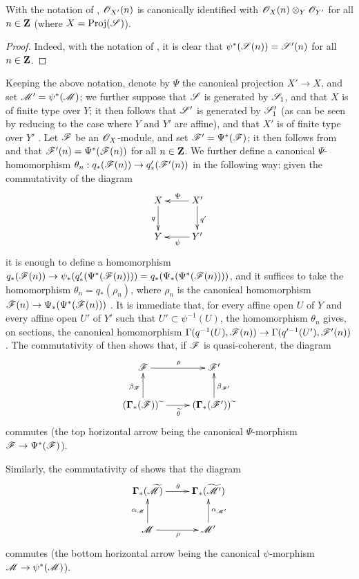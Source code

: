 \begin{corollary}[3.5.4]
\label{II.3.5.4}
With the notation of , $\mathscr{O}_{X'}(n)$ is canonically identified with $\mathscr{O}_X(n)\otimes_Y\mathscr{O}_{Y'}$ for all $n\in\mathbf{Z}$ (where $X=\operatorname{Proj}(\mathscr{S})$).
\end{corollary}

\begin{proof}
Indeed, with the notation of , it is clear that $\psi^*(\mathscr{S}(n))=\mathscr{S}'(n)$ for all $n\in\mathbf{Z}$.
\end{proof}

\begin{env}[3.5.5]
\label{II.3.5.5}
Keeping the above notation, denote by $\Psi$ the canonical projection $X'\to X$, and set $\mathscr{M}'=\psi^*(\mathscr{M})$;
we further suppose that $\mathscr{S}$ is generated by $\mathscr{S}_1$, and that $X$ is of finite type over $Y$;
it then follows that $\mathscr{S}'$ is generated by $\mathscr{S}'_1$ (as can be seen by reducing to the case where $Y$ and $Y'$ are affine), and that $X'$ is of finite type over $Y'$ .
Let $\mathscr{F}$ be an $\mathscr{O}_X$-module, and set $\mathscr{F}'=\Psi^*(\mathscr{F})$;
it then follows from  and  that $\mathscr{F}'(n)=\Psi^*(\mathscr{F}(n))$ for all $n\in\mathbf{Z}$.
We further define a canonical $\Psi$-homomorphism $\theta_n:q_*(\sh{F}(n))\to q'_*(\sh{F}'(n))$ in the following way: given the commutativity of the diagram
\[
  \xymatrix{
    X \ar[d]_{q}
    & X' \ar[l]_{\Psi} \ar[d]^{q'}
  \\Y
    & Y' \ar[l]^{\psi}
  }
\]
it is enough to define a homomorphism $q_*(\sh{F}(n))\to\psi_*(q'_*(\Psi^*(\sh{F}(n))))=q_*(\Psi_*(\Psi^*(\sh{F}(n))))$, and it suffices to take the homomorphism $\theta_n=q_*(\rho_n)$, where $\rho_n$ is the canonical homomorphism $\sh{F}(n)\to\Psi_*(\Psi^*(\sh{F}(n)))$ .
It is immediate that, for every affine open $U$ of $Y$ and every affine open $U'$ of $Y'$ such that $U'\subset\psi^{-1}(U)$, the homomorphism $\theta_n$ gives, on sections, the canonical homomorphism  $\Gamma(q^{-1}(U),\sh{F}(n))\to\Gamma(q'^{-1}(U'),\sh{F}'(n))$.
The commutativity of  then shows that, if $\mathscr{F}$ is quasi-coherent, the diagram
\[
  \xymatrix{
    \sh{F} \ar[r]^{\rho}
    & \sh{F}'
  \\(\bbGamma_*(\sh{F}))\supertilde \ar[u]^{\beta_{\sh{F}}} \ar[r]_{\widetilde{\theta}}
    & (\bbGamma_*(\sh{F}'))\supertilde \ar[u]_{\beta_{\sh{F}'}}
  }
\]
commutes (the top horizontal arrow being the canonical $\Psi$-morphism $\sh{F}\to\Psi^*(\sh{F})$).

Similarly, the commutativity of  shows that the diagram
\[
  \xymatrix{
    \bbGamma_*(\widetilde{\sh{M}}) \ar[r]^{\theta}
    & \bbGamma_*(\widetilde{\sh{M}'})
  \\\sh{M} \ar[r]_{\rho} \ar[u]^{\alpha_{\sh{M}}}
    & \sh{M}' \ar[u]_{\alpha_{\sh{M}'}}
  }
\]
commutes (the bottom horizontal arrow being the canonical $\psi$-morphism $\sh{M}\to\psi^*(\sh{M})$).
\end{env}

